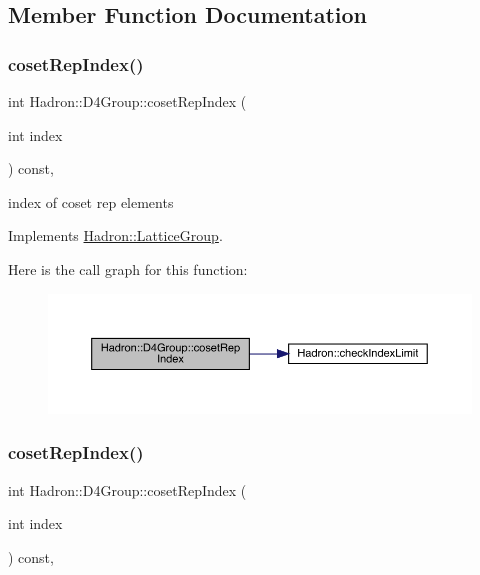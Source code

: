 \subsection{Member Function Documentation}
\mbox{\label{structHadron_1_1D4Group_ae7ebfa25f82987479c33f0d5d769ab2f}} 
\subsubsection{\texorpdfstring{cosetRepIndex()}{cosetRepIndex()}\hspace{0.1cm}{\footnotesize\ttfamily [1/2]}}
{\footnotesize\ttfamily int Hadron\+::\+D4\+Group\+::coset\+Rep\+Index (\begin{DoxyParamCaption}\item[{int}]{index }\end{DoxyParamCaption}) const\hspace{0.3cm}{\ttfamily [inline]}, {\ttfamily [virtual]}}

index of coset rep elements 

Implements \mbox{\hyperlink{structHadron_1_1LatticeGroup_a7e3b9b5e2f596e6c40d64aa939a3ad6c}{Hadron\+::\+Lattice\+Group}}.

Here is the call graph for this function\+:
\nopagebreak
\begin{figure}[H]
\begin{center}
\leavevmode
\includegraphics[width=350pt]{de/d5e/structHadron_1_1D4Group_ae7ebfa25f82987479c33f0d5d769ab2f_cgraph}
\end{center}
\end{figure}
\mbox{\label{structHadron_1_1D4Group_ae7ebfa25f82987479c33f0d5d769ab2f}} 
\subsubsection{\texorpdfstring{cosetRepIndex()}{cosetRepIndex()}\hspace{0.1cm}{\footnotesize\ttfamily [2/2]}}
{\footnotesize\ttfamily int Hadron\+::\+D4\+Group\+::coset\+Rep\+Index (\begin{DoxyParamCaption}\item[{int}]{index }\end{DoxyParamCaption}) const\hspace{0.3cm}{\ttfamily [inline]}, {\ttfamily [virtual]}}


